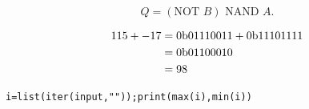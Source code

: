 \documentclass{article}
\begin{document}
$$Q = (\text{NOT } B) \text{ NAND } A.$$

\newpage{}

    \begin{align*}
        115 + -17 &= 0\text b01110011 +
                     0\text b11101111 \\
                  &= 0\text b01100010 \\
                  &= 98
    \end{align*}

\newpage{}
\begin{verbatim}i=list(iter(input,""));print(max(i),min(i))
\end{verbatim}
\end{document}
